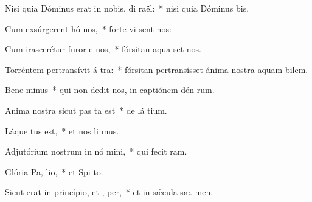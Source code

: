 \item Nisi quia Dóminus erat in nobis, di  raël:~* nisi quia Dóminus   bis,
\item Cum exsúrgerent hó  nos,~* forte vi sent nos:
\item Cum irascerétur furor e  nos,~* fórsitan aqua set nos.
\item Torréntem pertransívit á tra:~* fórsitan pertransísset ánima nostra aquam bilem.
\item Bene minus~* qui non dedit nos, in captiónem dén rum.
\item Anima nostra sicut pas ta est~* de lá tium.
\item Láque tus est,~* et nos li mus.
\item Adjutórium nostrum in nó mini,~* qui fecit   ram.
\item Glória Pa,  lio,~* et Spi to.
\item Sicut erat in princípio, et ,  per,~* et in sǽcula sæ. men.
